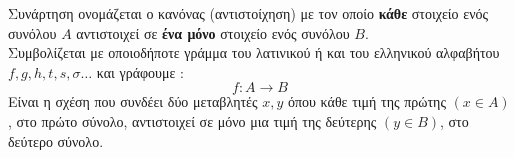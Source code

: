 \documentclass[twoside,nofonts,ektypwsh,math,spyros]{frontisthrio}
\begin{document}
\orismoi
{}
Συνάρτηση ονομάζεται ο κανόνας (αντιστοίχηση) με τον οποίο \textbf{κάθε} στοιχείο ενός συνόλου $ A $ αντιστοιχεί σε \textbf{ένα μόνο} στοιχείο ενός συνόλου $ B $.\\Συμβολίζεται με οποιοδήποτε γράμμα του λατινικού ή και του ελληνικού αλφαβήτου $ f, g, h, t, s, \sigma\ldots $ και γράφουμε : \[ f:A\rightarrow B \]
Είναι η σχέση που συνδέει δύο μεταβλητές $ x,y $ όπου κάθε τιμή της πρώτης $ (x\in A) $, στο πρώτο σύνολο, αντιστοιχεί σε μόνο μια τιμή της δεύτερης $ (y\in B) $, στο δεύτερο σύνολο.\vspace{-3mm}
\begin{center}
\begin{figure}[h]
\centering
{}
\end{figure}
\end{center}
\vspace{-1.1cm}
\end{document}
